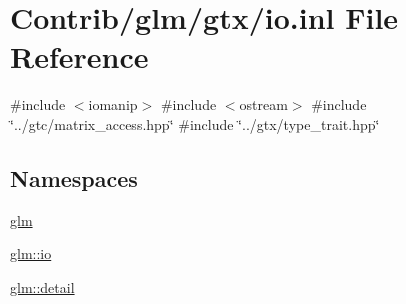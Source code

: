 \hypertarget{io_8inl}{}\section{Contrib/glm/gtx/io.inl File Reference}
\label{io_8inl}
{\ttfamily \#include $<$iomanip$>$}\newline
{\ttfamily \#include $<$ostream$>$}\newline
{\ttfamily \#include \char`\"{}../gtc/matrix\+\_\+access.\+hpp\char`\"{}}\newline
{\ttfamily \#include \char`\"{}../gtx/type\+\_\+trait.\+hpp\char`\"{}}\newline
\subsection*{Namespaces}
\begin{DoxyCompactItemize}
\item 
 \mbox{\hyperlink{namespaceglm}{glm}}
\item 
 \mbox{\hyperlink{namespaceglm_1_1io}{glm\+::io}}
\item 
 \mbox{\hyperlink{namespaceglm_1_1detail}{glm\+::detail}}
\end{DoxyCompactItemize}
